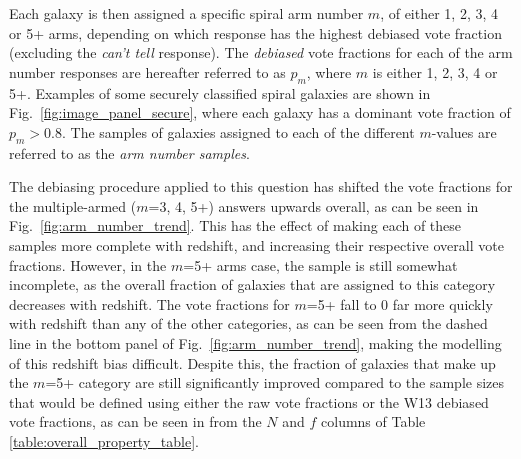 \documentclass[useAMS,usenatbib]{mn2e}
\begin{document}
Each galaxy is then assigned a specific spiral arm number $m$, of either 1, 2, 3, 4 or 5+ arms, depending on which response has the highest debiased vote fraction (excluding the \textit{can't tell} response). The \emph{debiased} vote fractions for each of the arm number responses are hereafter referred to as $p_m$, where $m$ is either 1, 2, 3, 4 or 5+. Examples of some securely classified spiral galaxies are shown in Fig.~\ref{fig:image_panel_secure}, where each galaxy has a dominant vote fraction of $p_m > 0.8$. The samples of galaxies assigned to each of the different $m$-values are referred to as the \textit{arm number samples}. 

The debiasing procedure applied to this question has shifted the vote fractions for the multiple-armed ($m$=3, 4, 5+) answers upwards overall, as can be seen in Fig.~\ref{fig:arm_number_trend}. This has the effect of making each of these samples more complete with redshift, and increasing their respective overall vote fractions. However, in the $m$=5+ arms case, the sample is still somewhat incomplete, as the overall fraction of galaxies that are assigned to this category decreases with redshift. The vote fractions for $m$=5+ fall to 0 far more quickly with redshift than any of the other categories, as can be seen from the dashed line in the bottom panel of Fig.~\ref{fig:arm_number_trend}, making the  modelling of this redshift bias difficult. Despite this, the fraction of galaxies that make up the $m$=5+ category are still significantly improved compared to the sample sizes that would be defined using either the raw vote fractions or the W13 debiased vote fractions, as can be seen in from the $N$ and $f$ columns of Table \ref{table:overall_property_table}. 
\end{document}
